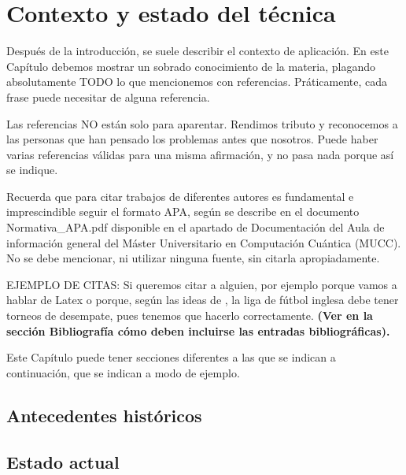 \chapter{Contexto y estado del técnica}

Después de la introducción, se suele describir el contexto de aplicación. En este Capítulo debemos mostrar un sobrado conocimiento de la materia, plagando absolutamente TODO lo que mencionemos con referencias. Práticamente, cada frase puede necesitar de alguna referencia.

Las referencias NO están solo para aparentar. Rendimos tributo y reconocemos a las personas que han pensado los problemas antes que nosotros. Puede haber varias referencias válidas para una misma afirmación, y no pasa nada porque así se indique.

Recuerda que para citar trabajos de diferentes autores es fundamental e imprescindible seguir el formato APA, según se describe en el documento Normativa\_APA.pdf disponible en el apartado de Documentación del Aula de información general del Máster Universitario en Computación Cuántica (MUCC). No se debe mencionar, ni utilizar ninguna fuente, sin citarla apropiadamente.

EJEMPLO DE CITAS: Si queremos citar a alguien, por ejemplo porque vamos a hablar de Latex \citep{lamport1994} o porque, según las ideas de \cite{ackerman2017}, la liga de fútbol inglesa debe tener torneos de desempate, pues tenemos que hacerlo correctamente. {\bf{(Ver en la sección Bibliografía cómo deben incluirse las entradas bibliográficas).}}

Este Capítulo puede tener secciones diferentes a las que se indican a continuación, que se indican a modo de ejemplo.

\section{Antecedentes históricos}

\section{Estado actual}

